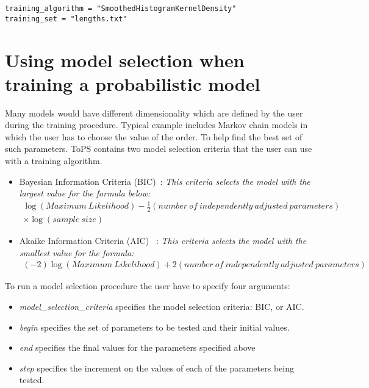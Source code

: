 \begin{Verbatim}[frame=single, label=train.txt]
training_algorithm = "SmoothedHistogramKernelDensity"
training_set = "lengths.txt"
\end{Verbatim}


\section{Using model selection when training a probabilistic model}


Many models would have different dimensionality which are defined by the user during the training procedure. Typical example includes Markov chain models in which the user has to choose the value of the order. To help find the best set of such parameters. ToPS contains two model selection criteria that the user can use with a training algorithm.

\vspace{1em}
\begin{minipage}{\textwidth}
\begin{itemize}
\item  Bayesian Information Criteria (BIC)~\cite{Schwarz1978}: \textit{This criteria selects the model with the largest value for the formula below:}
\begin{align*}
\log (Maximum~Likelihood) - \frac{1}{2} (number~of~independently~adjusted~parameters) \\ \times \log (sample~size)
\end{align*}
\vspace{1em}

\item Akaike Information Criteria (AIC) ~\cite{Akaike1974}: \textit{This criteria selects the model with the smallest value for the formula:}
\begin{align*}
(-2) \log (Maximum~Likelihood) + 2  (number~of~independently~adjusted~parameters)
\end{align*}
\end{itemize}
\end{minipage}
\vspace{1em}

To run a model selection procedure the user have to specify four arguments:

\begin{itemize}
\item \textit{model\_selection\_criteria} specifies the model selection criteria: BIC, or AIC.
\item \textit{begin} specifies the set of parameters to be tested and their initial values.
\item \textit{end} specifies  the final values for the parameters specified above
\item \textit{step} specifies the increment on the values of each of the parameters being tested.
\end{itemize}


